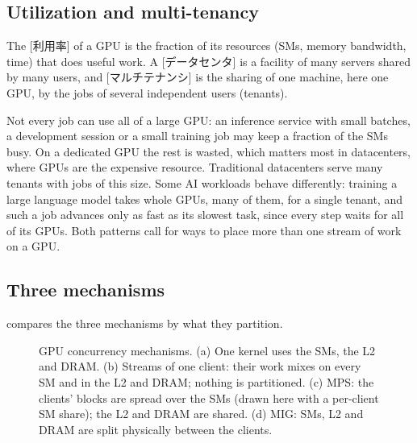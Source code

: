 \documentclass[../main.tex]{subfiles}
\begin{document}
\subsection{Utilization and multi-tenancy}

\begin{definition}
  The [利用率] of a GPU is the fraction of its
  resources (SMs, memory bandwidth, time) that does useful work.  A
  [データセンタ] is a facility of many servers
  shared by many users, and [マルチテナンシ] is the
  sharing of one machine, here one GPU, by the jobs of several
  independent users (tenants).
\end{definition}

Not every job can use all of a large GPU: an inference service with
small batches, a development session or a small training job may keep a
fraction of the SMs busy.  On a dedicated GPU the rest is wasted, which
matters most in datacenters, where GPUs are the expensive resource.
Traditional datacenters serve many tenants with jobs of this size.  Some
AI workloads behave differently: training a large language model takes
whole GPUs, many of them, for a single tenant, and such a job advances
only as fast as its slowest task, since every step waits for all of its
GPUs.  Both
patterns call for ways to place more than one stream of work on a GPU.

\subsection{Three mechanisms}

 compares the three mechanisms by what they
partition.

\begin{figure}[tb]
  \centering
  
  \caption{GPU concurrency mechanisms.  (a) One kernel uses the SMs, the
    L2 and DRAM.  (b) Streams of one client: their work mixes on every
    SM and in the L2 and DRAM; nothing is partitioned.  (c) MPS: the
    clients' blocks are spread over the SMs (drawn here with a per-client
    SM share); the L2 and DRAM are shared.  (d)
    MIG: SMs, L2 and DRAM are split physically between the clients.}
  \label{fig:l09-concurrency}
\end{figure}
\end{document}
